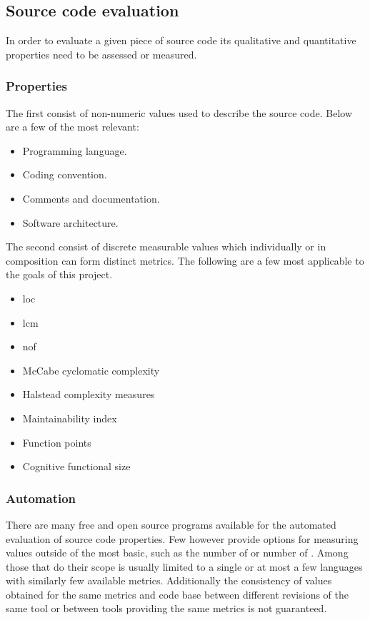 \subsection{Source code evaluation}

In order to evaluate a given piece of source code its qualitative and quantitative properties need to be assessed or measured.

\subsubsection{Properties}

The first consist of non-numeric values used to describe the source code. Below are a few of the most relevant:

\begin{itemize}
    \item Programming language.
    \item Coding convention.
    \item Comments and documentation.
    \item Software architecture.
\end{itemize}

The second consist of discrete measurable values which individually or in composition can form distinct metrics. The following are a few most applicable to the goals of this project.

\begin{itemize}
    \item \Gls{loc} \cite{loc}
    \item \Gls{lcm} \cite{lcm-1,lcm-2}
    \item \Gls{nof} \cite{nof}
    \item McCabe cyclomatic complexity \cite{mccabe-complexity}
    \item Halstead complexity measures \cite{halstead-complexity}
    \item Maintainability index \cite{maintainability-1,maintainability-2}
    \item Function points \cite{functional-size}
    \item Cognitive functional size \cite{cognitive-complexity}
\end{itemize}

\subsubsection{Automation}

There are many free and open source programs available for the automated evaluation of source code properties. Few however provide options for measuring values outside of the most basic, such as the number of  or number of . Among those that do their scope is usually limited to a single or at most a few languages with similarly few available metrics. Additionally the consistency of values obtained for the same metrics and code base between different revisions of the same tool or between tools providing the same metrics is not guaranteed.

